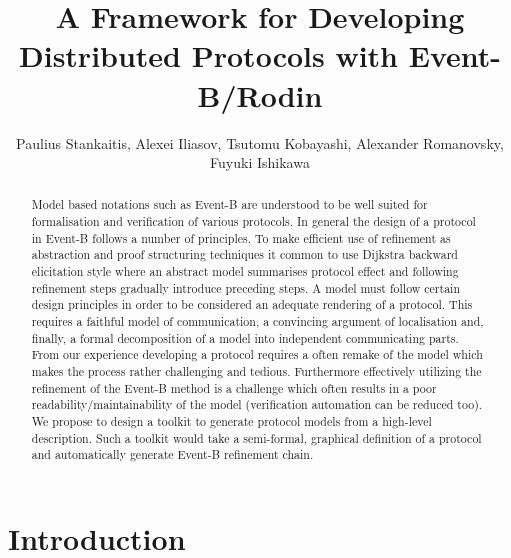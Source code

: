 \documentclass{llncs}
\begin{document}
	
	\title{A Framework for Developing Distributed Protocols with Event-B/Rodin}
	
	\author{Paulius Stankaitis, Alexei Iliasov, Tsutomu Kobayashi, Alexander Romanovsky, Fuyuki Ishikawa}
	
	\maketitle
	
	\begin{abstract}
		Model based notations such as Event-B are understood to be well suited for formalisation and verification of various protocols. In general the design of a protocol in Event-B follows a number of principles. 	To make efficient use of refinement as abstraction and proof structuring techniques it common to use Dijkstra backward elicitation style where an abstract model summarises protocol effect and following refinement steps gradually introduce preceding steps. A model must follow certain design principles in order to be considered an adequate rendering of a protocol. This requires a faithful model of communication, a convincing argument of localisation and, finally, a formal decomposition of a model into independent communicating parts. From our experience developing a protocol requires a often remake of the model which makes the process rather challenging and tedious. Furthermore effectively utilizing the refinement of the Event-B method is a challenge which often results in a poor readability/maintainability of the model (verification automation can be reduced too). We propose to design a toolkit to generate protocol models from a high-level description. Such a toolkit would take a semi-formal, graphical definition of a protocol and automatically generate Event-B refinement chain.
	\end{abstract}
	
	\section{Introduction}
	
\end{document}
